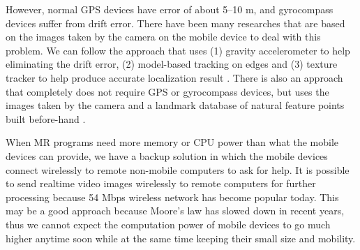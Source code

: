 However, normal GPS devices have error of about 5--10 m, and gyrocompass devices suffer from drift error. There have been many researches that are based on the images taken by the camera on the mobile device to deal with this problem. We can follow the approach that uses (1) gravity accelerometer to help eliminating the drift error, (2) model-based tracking on edges and (3) texture tracker to help produce accurate localization result \cite{Reference13}. There is also an approach that completely does not require GPS or gyrocompass devices, but uses the images taken by the camera and a landmark database of natural feature points built before-hand \cite{Reference21}.

When MR programs need more memory or CPU power than what the mobile devices can provide, we have a backup solution in which the mobile devices connect wirelessly to remote non-mobile computers to ask for help. It is possible to send realtime video images wirelessly to remote computers for further processing because 54 Mbps wireless network has become popular today. This may be a good approach because Moore's law has slowed down in recent years, thus we cannot expect the computation power of mobile devices to go much higher anytime soon while at the same time keeping their small size and mobility.
